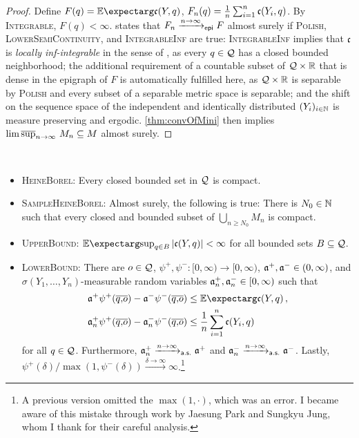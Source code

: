%
\begin{proof}
Define $F(q) = \Ex{\mf c(Y, q)}$, $F_n(q) = \frac1n\sum_{i=1}^n \mathfrak{c}(Y_i, q)$. By \textsc{Integrable}, $F(q)<\infty$.
\cite[Theorem 8.2]{korf01} states that $F_n \xrightarrow{n\to\infty}_{\mathsf{epi}} F$ almost surely if \textsc{Polish}, \textsc{LowerSemiContinuity}, and \textsc{IntegrableInf} are true: \textsc{IntegrableInf} implies that $\mathfrak{c}$ is \textit{locally inf-integrable} in the sense of \cite[Definition 4.2]{korf01}, as every $q\in\mathcal{Q}$ has a closed bounded neighborhood; the additional requirement of a countable subset of $\mathcal{Q} \times \mathbb{R}$ that is dense in the epigraph of $F$ is automatically fulfilled here, as $\mathcal{Q}\times\mathbb{R}$ is separable by \textsc{Polish} and every subset of a separable metric space is separable; and the shift on the sequence space of the independent and identically distributed $(Y_i)_{i\in\mathbb{N}}$ is measure preserving and ergodic. \autoref{thm:convOfMini} then implies $\operatorname*{lim\, \overline{sup}}_{n\to\infty}\, M_n \subseteq M$ almost surely.
\end{proof}
%
\begin{assumptions}\mbox{ }
\begin{itemize}
	\item \textsc{HeineBorel}: Every closed bounded set in $\mathcal{Q}$ is compact.
	\item \textsc{SampleHeineBorel}: Almost surely, the following is true: There is $N_0\in\mathbb{N}$ such that every closed and bounded subset of $\bigcup_{n\geq N_0} M_n$ is compact.
	\item \textsc{UpperBound}: $\Ex{\sup_{q\in B} \abs{\mf c(Y,q)}} < \infty$ for all bounded sets $B\subseteq\mathcal{Q}$.
	\item \textsc{LowerBound}: There are $o\in\mathcal{Q}$, $\psi^+, \psi^- \colon [0,\infty) \to [0,\infty)$, $\mathfrak{a}^+, \mathfrak{a}^- \in(0,\infty)$, and $\sigma(Y_1, \dots, Y_n)$-measurable random variables $\mathfrak{a}^+_n, \mathfrak{a}^-_n \in[0,\infty)$ such that 
	\begin{align*}
		\mf a^+ \psi^+(\ol qo) - \mf a^- \psi^-(\ol qo) &\leq \Ex{\mf c(Y, q)}
		\eqcm\\
		\mf a^+_n \psi^+(\ol qo) - \mf a^-_n \psi^-(\ol qo) &\leq \frac1n \sum_{i=1}^n \mf c(Y_i, q)
	\end{align*}
	for all $q\in\mathcal{Q}$. Furthermore, $\mathfrak{a}^+_n\xrightarrow{n\to\infty}_{\mathsf{a.s.}}\mathfrak{a}^+$ and $\mathfrak{a}^-_n\xrightarrow{n\to\infty}_{\mathsf{a.s.}}\mathfrak{a}^-$. Lastly, $\psi^+(\delta)/\max(1, \psi^-(\delta))\xrightarrow{\delta\to\infty}\infty$.\footnote{A previous version omitted the $\max(1,\cdot)$, which was an error. I became aware of this mistake through work by Jaesung Park and Sungkyu Jung, whom I thank for their careful analysis.}
	\end{itemize}
\end{assumptions}
